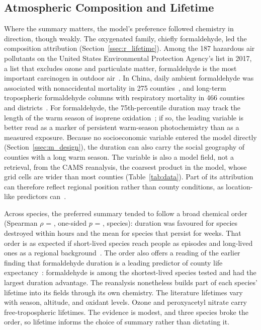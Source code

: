 \documentclass[sensors,article,submit,moreauthors,pdftex]{Definitions/mdpi}
\begin{document}
\subsection{Atmospheric Composition and Lifetime}
\label{ssec:d_physics}
Where the summary matters, the model's preference followed chemistry in
direction, though weakly. The oxygenated family, chiefly formaldehyde, led the
composition attribution
(Section~\ref{ssec:r_lifetime}). Among the
187 hazardous air pollutants on the United States Environmental Protection
Agency's list in 2017, a list that excludes ozone and particulate matter,
formaldehyde is the most important carcinogen in outdoor air~\cite{Zhu2017}.
In China, daily ambient formaldehyde was associated with nonaccidental
mortality in 275 counties~\cite{Ban2022}, and long-term tropospheric
formaldehyde columns with respiratory mortality in 466 counties and
districts~\cite{Yu2024}.
For formaldehyde, the 75th-percentile duration may
track the length of the warm season of isoprene
oxidation~\cite{Millet2008}; if so, the leading variable is better read as a
marker of persistent warm-season photochemistry than as a measured exposure.
Because no socioeconomic variable entered the model directly
(Section~\ref{ssec:m_design}), the duration can also
carry the social geography of counties with a long warm season. The variable
is also a model field, not a retrieval, from the CAMS reanalysis, the coarsest
product in the model, whose grid cells are wider than most counties
(Table~\ref{tab:data}). Part of its attribution can therefore reflect regional
position rather than county conditions, as location-like predictors
can~\cite{Meyer2019}.

Across species, the preferred summary tended to follow a broad chemical order
(Spearman $\rho$ = \LtRho{}, one-sided $p$ = \LtPermP{},
\LtSpecies{} species):
duration was favoured for species destroyed within hours and the mean for
species that persist for weeks. That order is as expected if short-lived
species reach people as episodes and long-lived ones as a regional
background~\cite{Seinfeld2016, AtkinsonArey2003}. The order also offers a reading of the earlier finding that
formaldehyde duration is a leading predictor of county life
expectancy~\cite{Shrestha2026exp}: formaldehyde is among the shortest-lived
species tested and had the largest duration advantage. The reanalysis
nonetheless builds part of each species' lifetime into its fields through its
own chemistry. The literature lifetimes
vary with season, altitude, and oxidant levels. Ozone and peroxyacetyl nitrate
carry free-tropospheric lifetimes. The evidence is modest, and three species broke the order, so
lifetime informs the choice of summary rather than dictating it.
\end{document}
